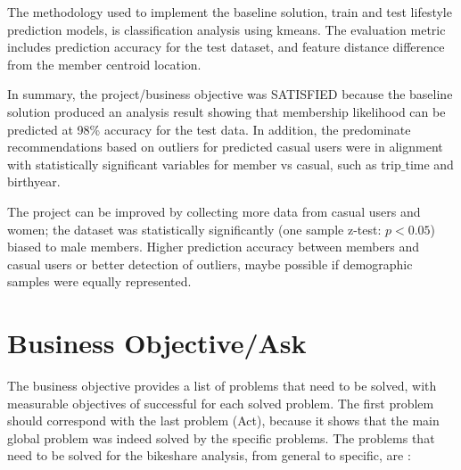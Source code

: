 \documentclass[11pt, onecolumn]{article}
\begin{document}
The methodology used to implement the baseline solution, train and test lifestyle prediction models, is classification analysis using kmeans. The evaluation metric includes prediction accuracy for the test dataset, and feature distance difference from the member centroid location.

In summary, the project/business objective was SATISFIED because the baseline solution produced an analysis result showing that membership likelihood can be predicted at 98\% accuracy for the test data. In addition, the predominate recommendations based on outliers for predicted casual users were in alignment with statistically significant variables for member vs casual, such as trip$\_$time and birthyear.  

The project can be improved by collecting more data from casual users and women; the dataset was statistically significantly (one sample z-test: $p < 0.05$) biased to male members. Higher prediction accuracy between members and casual users or better detection of outliers, maybe possible if demographic samples were equally represented.

\section{Business Objective/Ask}

The business objective provides a list of problems that need to be solved, with measurable objectives of successful for each solved problem. The first problem should correspond with the last problem (Act), because it shows that the main global problem was indeed solved by the specific problems. The problems that need to be solved for the bikeshare analysis, from general to specific, are : 
\end{document}
